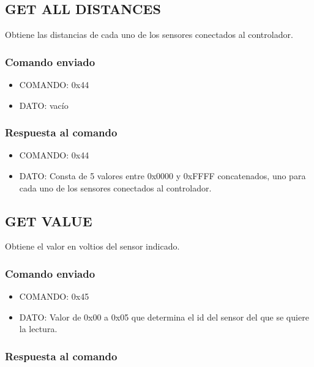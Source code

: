 \documentclass[a4paper,10pt]{article}
\begin{document}
\subsection{GET ALL DISTANCES}
\label{get_all_distances_ds}

Obtiene las distancias de cada uno de los sensores conectados al controlador.

\subsubsection*{Comando enviado}

\begin{itemize}
	\item{COMANDO:} 0x44
	\item{DATO:} vac\'io
\end{itemize}

\subsubsection*{Respuesta al comando}

\begin{itemize}
	\item{COMANDO:} 0x44
	\item{DATO:} Consta de 5 valores entre 0x0000 y 0xFFFF concatenados, uno para cada uno de los sensores conectados al controlador.
\end{itemize}

\subsection{GET VALUE}
\label{get_value_ds}

Obtiene el valor en voltios del sensor indicado.

\subsubsection*{Comando enviado}

\begin{itemize}
	\item{COMANDO:} 0x45
	\item{DATO:} Valor de 0x00 a 0x05 que determina el id del sensor del que se quiere la lectura.
\end{itemize}

\subsubsection*{Respuesta al comando}
\end{document}
